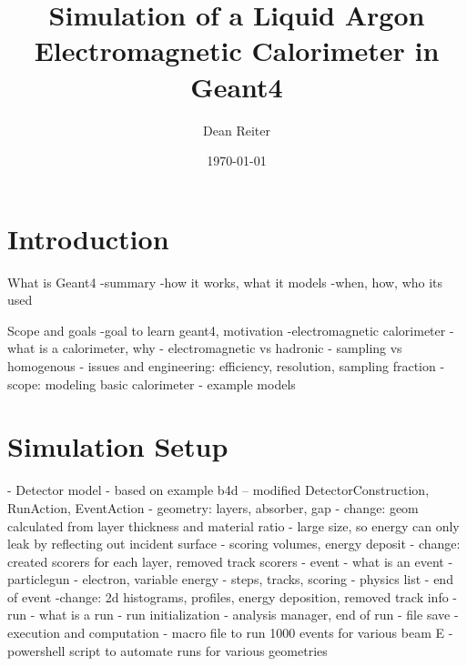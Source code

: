 \documentclass[%
 reprint,
 amsmath,amssymb,
 aps,
]{revtex4-2}
\begin{document}

\title{Simulation of a Liquid Argon Electromagnetic Calorimeter in Geant4}%

\author{Dean Reiter}
%

\date{\today}%

\begin{abstract}


\end{abstract}


\maketitle



\section{Introduction}

What is Geant4
-summary
-how it works, what it models
-when, how, who its used

Scope and goals
-goal to learn geant4, motivation
-electromagnetic calorimeter 
    - what is a calorimeter, why
    - electromagnetic vs hadronic
    - sampling vs homogenous
    - issues and engineering: efficiency, resolution, sampling fraction
-scope: modeling basic calorimeter
    - example models

\section{Simulation Setup}

- Detector model
    - based on example b4d -- modified DetectorConstruction, RunAction, EventAction
    - geometry: layers, absorber, gap
        - change: geom calculated from layer thickness and material ratio
        - large size, so energy can only leak by reflecting out incident surface
    - scoring volumes, energy deposit
        - change: created scorers for each layer, removed track scorers
- event 
    - what is an event
    - particlegun - electron, variable energy
    - steps, tracks, scoring
    - physics list
    - end of event
        -change: 2d histograms, profiles, energy deposition, removed track info
- run 
    - what is a run
    - run initialization
    - analysis manager, end of run
        - file save
- execution and computation
    - macro file to run 1000 events for various beam E
    - powershell script to automate runs for various geometries
\end{document}
